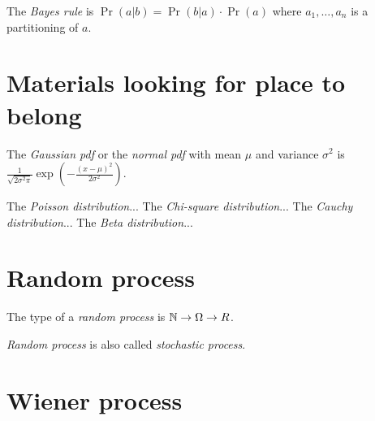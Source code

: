 %
The \emph{Bayes rule} is \(\Pr(a|b) = \Pr(b|a) \cdot \Pr(a)\)
where \(a_1,\ldots,a_n\) is a partitioning of \(a\).

\section{Materials looking for place to belong}

%
%
%
%
%
%
%
%
The \emph{Gaussian pdf} or the \emph{normal pdf}
with mean \(\mu\) and variance \(\sigma^2\) is
\(\frac{1}{\sqrt{2\sigma^2\pi}}\exp\left(-\frac{(x-\mu)^2}{2\sigma^2}\right)\).

%
%
%
%
The \emph{Poisson distribution}...
The \emph{Chi-square distribution}...
The \emph{Cauchy distribution}...
The \emph{Beta distribution}...

\section{Random process}

The type of a \emph{random process} is \(\mathbb{N} \to \Omega \to R\).

\emph{Random process} is also called \emph{stochastic process}.

\section{Wiener process}
